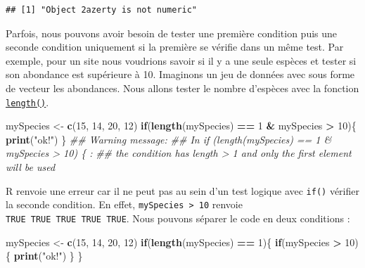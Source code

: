 \documentclass[
]{book}
\newenvironment{Shaded}{\begin{snugshade}}{\end{snugshade}}
\newcommand{\CommentTok}[1]{\textcolor[rgb]{0.56,0.35,0.01}{\textit{#1}}}
\newcommand{\ControlFlowTok}[1]{\textcolor[rgb]{0.13,0.29,0.53}{\textbf{#1}}}
\newcommand{\DecValTok}[1]{\textcolor[rgb]{0.00,0.00,0.81}{#1}}
\newcommand{\KeywordTok}[1]{\textcolor[rgb]{0.13,0.29,0.53}{\textbf{#1}}}
\newcommand{\NormalTok}[1]{#1}
\newcommand{\OperatorTok}[1]{\textcolor[rgb]{0.81,0.36,0.00}{\textbf{#1}}}
\newcommand{\StringTok}[1]{\textcolor[rgb]{0.31,0.60,0.02}{#1}}
\begin{document}
\begin{verbatim}
## [1] "Object 2azerty is not numeric"
\end{verbatim}

Parfois, nous pouvons avoir besoin de tester une première condition puis une seconde condition uniquement si la première se vérifie dans un même test. Par exemple, pour un site nous voudrions savoir si il y a une seule espèces et tester si son abondance est supérieure à 10. Imaginons un jeu de données avec sous forme de vecteur les abondances. Nous allons tester le nombre d'espèces avec la fonction \protect\hyperlink{l015length}{\texttt{length()}}.

\begin{Shaded}
\begin{Highlighting}[]
\NormalTok{mySpecies <-}\StringTok{ }\KeywordTok{c}\NormalTok{(}\DecValTok{15}\NormalTok{, }\DecValTok{14}\NormalTok{, }\DecValTok{20}\NormalTok{, }\DecValTok{12}\NormalTok{)}
\ControlFlowTok{if}\NormalTok{(}\KeywordTok{length}\NormalTok{(mySpecies) }\OperatorTok{==}\StringTok{ }\DecValTok{1} \OperatorTok{&}\StringTok{ }\NormalTok{mySpecies }\OperatorTok{>}\StringTok{ }\DecValTok{10}\NormalTok{)\{}
  \KeywordTok{print}\NormalTok{(}\StringTok{"ok!"}\NormalTok{)}
\NormalTok{\}}
\CommentTok{## Warning message:}
\CommentTok{## In if (length(mySpecies) == 1 & mySpecies > 10) \{ :}
\CommentTok{##   the condition has length > 1 and only the first element will be used}
\end{Highlighting}
\end{Shaded}

R renvoie une erreur car il ne peut pas au sein d'un test logique avec \texttt{if()} vérifier la seconde condition. En effet, \texttt{mySpecies\ \textgreater{}\ 10} renvoie \texttt{TRUE\ TRUE\ TRUE\ TRUE\ TRUE}. Nous pouvons séparer le code en deux conditions :

\begin{Shaded}
\begin{Highlighting}[]
\NormalTok{mySpecies <-}\StringTok{ }\KeywordTok{c}\NormalTok{(}\DecValTok{15}\NormalTok{, }\DecValTok{14}\NormalTok{, }\DecValTok{20}\NormalTok{, }\DecValTok{12}\NormalTok{)}
\ControlFlowTok{if}\NormalTok{(}\KeywordTok{length}\NormalTok{(mySpecies) }\OperatorTok{==}\StringTok{ }\DecValTok{1}\NormalTok{)\{}
  \ControlFlowTok{if}\NormalTok{(mySpecies }\OperatorTok{>}\StringTok{ }\DecValTok{10}\NormalTok{)\{}
    \KeywordTok{print}\NormalTok{(}\StringTok{"ok!"}\NormalTok{)}
\NormalTok{  \}}
\NormalTok{\}}
\end{Highlighting}
\end{Shaded}
\end{document}
